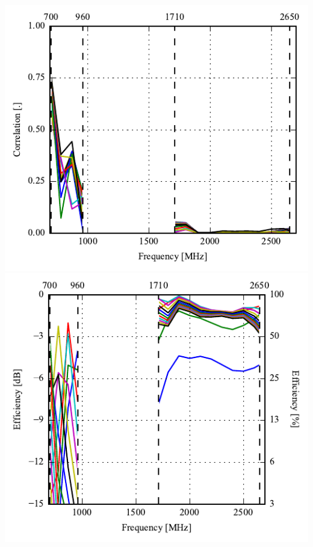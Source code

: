 \begin{frame}
\begin{minipage}[t]{0.49\linewidth}
    \includegraphics[width=0.78\linewidth]{img/henrik/dp/sweep_side_corr} \\
    \includegraphics[width=0.78\linewidth]{img/henrik/dp/efficiency-ac3-side.pdf} 

  \end{minipage}    

\end{frame}









